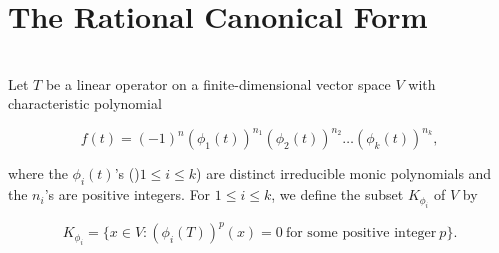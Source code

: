 \section{The Rational Canonical Form}

\begin{definition}
	\hfill\\
	Let $T$ be a linear operator on a finite-dimensional vector space $V$ with characteristic polynomial

	\[f(t) = (-1)^n(\phi_1(t))^{n_1}(\phi_2(t))^{n_2} \dots (\phi_k(t))^{n_k},\]

	where the $\phi_i(t)$'s ()$1 \leq i \leq k$) are distinct irreducible monic polynomials and the $n_i$'s are positive integers. For $1 \leq i \leq k$, we define the subset $K_{\phi_i}$ of $V$ by

	\[K_{\phi_i} = \{x \in V : (\phi_i(T))^p(x) = 0\ \text{for some positive integer}\ p\}.\]
\end{definition}

